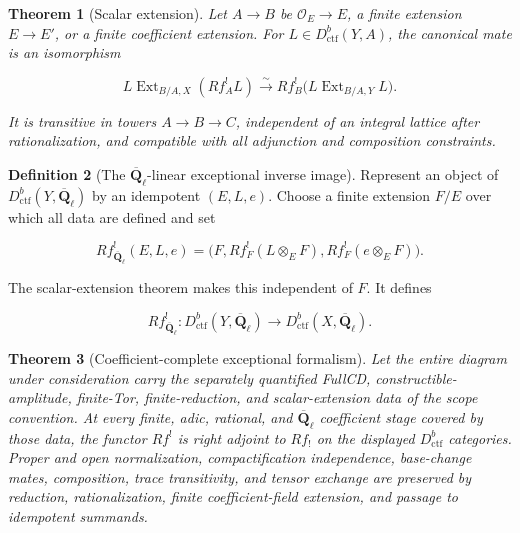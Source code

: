 \documentclass[10pt]{article}
\newtheorem{theorem}{Theorem}[section]
\theoremstyle{definition}
\newtheorem{definition}[theorem]{Definition}
\newcommand{\Qlb}{\overline{\mathbf Q}_\ell}
\newcommand{\OO}{\mathcal O}
\newcommand{\Dctf}{D^b_{\mathrm{ctf}}}
\begin{document}
\begin{theorem}[Scalar extension]
Let \(A\to B\) be \(\OO_E\to E\), a finite extension \(E\to E'\), or a
finite coefficient extension.  For \(L\in\Dctf(Y,A)\), the canonical mate
is an isomorphism

\[
 L\operatorname{Ext}_{B/A,X}(Rf^!_A L)
 \xrightarrow{\sim}
 Rf^!_B\bigl(L\operatorname{Ext}_{B/A,Y}L\bigr).
\]

It is transitive in towers \(A\to B\to C\), independent of an integral
lattice after rationalization, and compatible with all adjunction and
composition constraints.
\end{theorem}

\begin{definition}[The \(\Qlb\)-linear exceptional inverse image]
Represent an object of \(\Dctf(Y,\Qlb)\) by an idempotent
\((E,L,e)\).  Choose a finite extension \(F/E\) over which all data are
defined and set

\[
 Rf^!_{\Qlb}(E,L,e)=
 \bigl(F,Rf^!_F(L\otimes_EF),Rf^!_F(e\otimes_EF)\bigr).
\]

The scalar-extension theorem makes this independent of \(F\).  It defines

\[
 Rf^!_{\Qlb}:\Dctf(Y,\Qlb)\longrightarrow\Dctf(X,\Qlb).
\]
\end{definition}

\begin{theorem}[Coefficient-complete exceptional formalism]
Let the entire diagram under consideration carry the separately quantified
FullCD, constructible-amplitude, finite-Tor, finite-reduction, and
scalar-extension data of the scope convention.  At every finite, adic,
rational, and \(\Qlb\) coefficient stage covered by those data, the functor
\(Rf^!\) is
right adjoint to \(Rf_!\) on the displayed \(\Dctf\) categories.  Proper and
open normalization, compactification independence,
base-change mates, composition, trace transitivity, and tensor exchange are
preserved by reduction, rationalization, finite coefficient-field extension, and passage
to idempotent summands.
\end{theorem}
\end{document}
